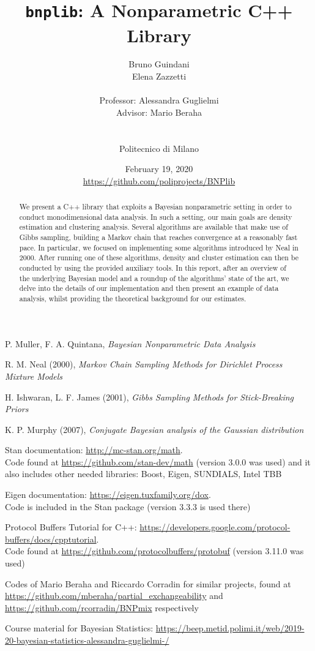 \documentclass[a4paper]{report}
\title{\texttt{bnplib}: A Nonparametric C++ Library}
\author{
Bruno Guindani \\
Elena Zazzetti \\
\\
Professor: Alessandra Guglielmi \\
Advisor: Mario Beraha \\
\\
\\
Politecnico di Milano \\
}
\date{
February 19, 2020
\\[100pt]
\url{https://github.com/poliprojects/BNPlib}}
\begin{document}
\maketitle

\begin{abstract}
We present a C++ library that exploits a Bayesian nonparametric setting in order to conduct monodimensional data analysis.
In such a setting, our main goals are density estimation and clustering analysis.
Several algorithms are available that make use of Gibbs sampling, building a Markov chain that reaches convergence at a reasonably fast pace.
In particular, we focused on implementing some algorithms introduced by Neal in 2000.
After running one of these algorithms, density and cluster estimation can then be conducted by using the provided auxiliary tools.
In this report, after an overview of the underlying Bayesian model and a roundup of the algorithms' state of the art, we delve into the details of our implementation and then present an example of data analysis, whilst providing the theoretical background for our estimates.
\end{abstract}
\clearpage

\tableofcontents




\begin{thebibliography}{9}
	 P. Muller, F. A. Quintana, \textit{Bayesian Nonparametric Data Analysis}
	
	 R. M. Neal (2000), \textit{Markov Chain Sampling Methods for Dirichlet Process Mixture Models}
	
	 H. Ishwaran, L. F. James (2001), \textit{Gibbs Sampling Methods for Stick-Breaking Priors}
	
	 K. P. Murphy (2007), \textit{Conjugate Bayesian analysis of the Gaussian distribution}
	
	 Stan documentation: \url{http://mc-stan.org/math}. \\
	Code found at \url{https://github.com/stan-dev/math} (version 3.0.0 was used) and it also includes other needed libraries: Boost, Eigen, SUNDIALS, Intel TBB
	
	 Eigen documentation: \url{https://eigen.tuxfamily.org/dox}. \\
	Code is included in the Stan package (version 3.3.3 is used there)
	
	 Protocol Buffers Tutorial for C++: \url{https://developers.google.com/protocol-buffers/docs/cpptutorial}. \\
	Code found at \url{https://github.com/protocolbuffers/protobuf} (version 3.11.0 was used)
	
	 Codes of Mario Beraha and Riccardo Corradin for similar projects, found at \url{https://github.com/mberaha/partial_exchangeability} and \url{https://github.com/rcorradin/BNPmix} respectively
	
	 Course material for Bayesian Statistics: \url{https://beep.metid.polimi.it/web/2019-20-bayesian-statistics-alessandra-guglielmi-/}
\end{thebibliography}
\end{document}
